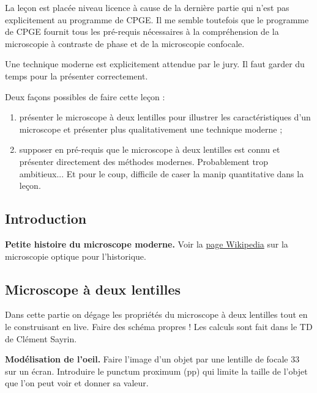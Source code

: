 \begin{remarque}
La leçon est placée niveau licence à cause de la dernière partie qui n'est pas explicitement au programme de CPGE.
Il me semble toutefois que le programme de CPGE fournit tous les pré-requis nécessaires à la compréhension de la microscopie à contraste de phase et de la microscopie confocale.

\noindent
Une technique moderne est explicitement attendue par le jury.
Il faut garder du temps pour la présenter correctement.

\noindent
Deux façons possibles de faire cette leçon :
\begin{enumerate}
\item présenter le microscope à deux lentilles pour illustrer les caractéristiques d'un microscope et présenter plus qualitativement une technique moderne ;
\item supposer en pré-requis que le microscope à deux lentilles est connu et présenter directement des méthodes modernes.
Probablement trop ambitieux...
Et pour le coup, difficile de caser la manip quantitative dans la leçon.
\end{enumerate}
\end{remarque}

\subsection*{Introduction}

\begin{slide}
\textbf{Petite histoire du microscope moderne.}
Voir la \href{https://fr.wikipedia.org/wiki/Microscope_optique}{page Wikipedia} sur la microscopie optique pour l'historique.
\end{slide}

\subsection{Microscope à deux lentilles}

Dans cette partie on dégage les propriétés du microscope à deux lentilles tout en le construisant en live.
Faire des schéma propres !
Les calculs sont fait dans le TD de Clément Sayrin.

\begin{experience}
\textbf{Modélisation de l'oeil.}
Faire l'image d'un objet par une lentille de focale \unit{33}{\centi\meter} sur un écran.
Introduire le punctum proximum (pp) qui limite la taille de l'objet que l'on peut voir et donner sa valeur.
\end{experience}

